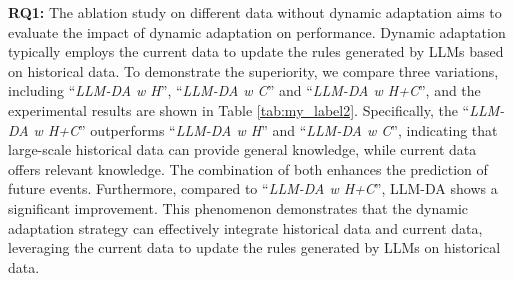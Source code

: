 \documentclass{article}
\begin{document}
\begin{table}[h]
\scriptsize
    \centering
    \caption{Ablation study on different data without dynamic adaptation on both datasets. The best results are in bold. ``LLM-DA \textit{w} H'' indicates ``only using the historical data'', ``LLM-DA \textit{w} C'' is ``only using the current data'', and ``LLM-DA \textit{w} H+C'' denotes ``using the historical and current data''.} 
\label{tab:my_label2}
\end{table}

\textbf{RQ1:} The ablation study on different data without dynamic adaptation aims to evaluate the impact of dynamic adaptation on performance. Dynamic adaptation typically employs the current data to update the rules generated by LLMs based on historical data.
To demonstrate the superiority, we compare three variations, including ``\textit{LLM-DA w H}'', ``\textit{LLM-DA w C}'' and ``\textit{LLM-DA w H+C}'', and the experimental results are shown in Table \ref{tab:my_label2}. 
Specifically, 
the ``\textit{LLM-DA w H+C}'' outperforms ``\textit{LLM-DA w H}'' and ``\textit{LLM-DA w C}'', indicating that large-scale historical data can provide general knowledge, while current data offers relevant knowledge. The combination of both enhances the prediction of future events. 
Furthermore, compared to ``\textit{LLM-DA w H+C}'', LLM-DA shows a significant improvement.  
This phenomenon demonstrates that the dynamic adaptation strategy can effectively integrate historical data and current data,
leveraging the current data to update the rules generated by LLMs on historical data. 
 
\end{document}

